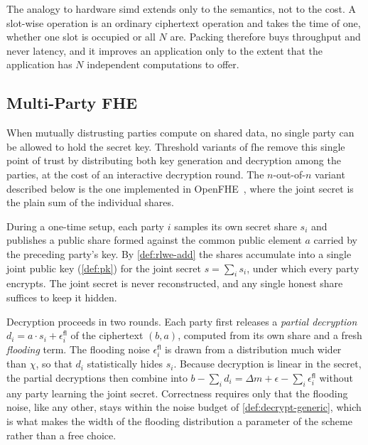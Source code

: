 { %
    The analogy to hardware \gls{simd} extends only to the semantics, not to the cost. A slot-wise operation is an ordinary ciphertext operation and takes the time of one, whether one slot is occupied or all $N$ are. Packing therefore buys throughput and never latency, and it improves an application only to the extent that the application has $N$ independent computations to offer.
    
    \subsection{Multi-Party FHE}
    \label{sec:mpfhe}
    When mutually distrusting parties compute on shared data, no single party can be allowed to hold the secret key. Threshold variants of \gls{fhe} remove this single point of trust by distributing both key generation and decryption among the parties, at the cost of an interactive decryption round. The $n$-out-of-$n$ variant described below is the one implemented in OpenFHE~\cite{cryptoeprint:2022/915}, where the joint secret is the plain sum of the individual shares.
    
    During a one-time setup, each party $i$ samples its own secret share $s_i$ and publishes a public share formed against the common public element $a$ carried by the preceding party's key. By \autoref{def:rlwe-add} the shares accumulate into a single joint public key (\autoref{def:pk}) for the joint secret $s = \sum_i s_i$, under which every party encrypts. The joint secret is never reconstructed, and any single honest share suffices to keep it hidden.
    
    Decryption proceeds in two rounds. Each party first releases a \emph{partial decryption} $d_i = a \cdot s_i + \epsilon^{\mathsf{fl}}_i$ of the ciphertext $(b, a)$, computed from its own share and a fresh \emph{flooding} term. The flooding noise $\epsilon^{\mathsf{fl}}_i$ is drawn from a distribution much wider than $\chi$, so that $d_i$ statistically hides $s_i$. Because decryption is linear in the secret, the partial decryptions then combine into $b - \sum_i d_i = \Delta m + \epsilon - \sum_i \epsilon^{\mathsf{fl}}_i$ without any party learning the joint secret. Correctness requires only that the flooding noise, like any other, stays within the noise budget of \autoref{def:decrypt-generic}, which is what makes the width of the flooding distribution a parameter of the scheme rather than a free choice.
}
